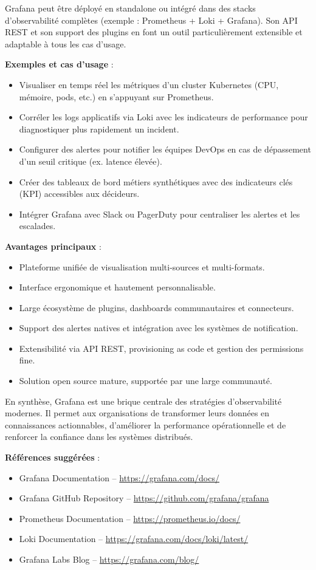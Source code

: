 Grafana peut être déployé en standalone ou intégré dans des stacks d’observabilité complètes (exemple  : Prometheus + Loki + Grafana). Son API REST et son support des plugins en font un outil particulièrement extensible et adaptable à tous les cas d’usage.

\textbf{Exemples et cas d’usage} :
\begin{itemize}
	\item Visualiser en temps réel les métriques d’un cluster Kubernetes (CPU, mémoire, pods, etc.) en s’appuyant sur Prometheus.
	\item Corréler les logs applicatifs via Loki avec les indicateurs de performance pour diagnostiquer plus rapidement un incident.
	\item Configurer des alertes pour notifier les équipes DevOps en cas de dépassement d’un seuil critique (ex. latence élevée).
	\item Créer des tableaux de bord métiers synthétiques avec des indicateurs clés (KPI) accessibles aux décideurs.
	\item Intégrer Grafana avec Slack ou PagerDuty pour centraliser les alertes et les escalades.
\end{itemize}

\textbf{Avantages principaux} :
\begin{itemize}
	\item Plateforme unifiée de visualisation multi-sources et multi-formats.
	\item Interface ergonomique et hautement personnalisable.
	\item Large écosystème de plugins, dashboards communautaires et connecteurs.
	\item Support des alertes natives et intégration avec les systèmes de notification.
	\item Extensibilité via API REST, provisioning as code et gestion des permissions fine.
	\item Solution open source mature, supportée par une large communauté.
\end{itemize}

En synthèse, Grafana est une brique centrale des stratégies d’observabilité modernes. Il permet aux organisations de transformer leurs données en connaissances actionnables, d’améliorer la performance opérationnelle et de renforcer la confiance dans les systèmes distribués.

\textbf{Références suggérées} :
\begin{itemize}
	\item Grafana Documentation – \url{https://grafana.com/docs/}
	\item Grafana GitHub Repository – \url{https://github.com/grafana/grafana}
	\item Prometheus Documentation – \url{https://prometheus.io/docs/}
	\item Loki Documentation – \url{https://grafana.com/docs/loki/latest/}
	\item Grafana Labs Blog – \url{https://grafana.com/blog/}
\end{itemize}

